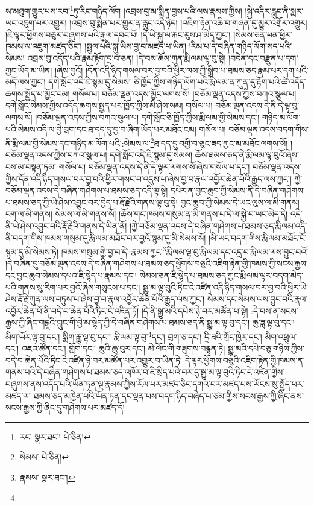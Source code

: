 ས་མཐུག་གྱུར་པས་རབ་\footnote{རང་  སྣར་ཐང་།  པེ་ཅིན། }ཏུ་རིང་གཉིད་ལོག །འབྲས་བུ་མ་སྨིན་བྱས་པའི་ལས་རྣམས་ཀྱིས། །སྐྱེ་འདིར་རླུང་ནི་སླར་ཡང་འཇུག་པར་འགྱུར། །འབྲས་བུ་སྨིན་པར་གྱུར་ན་རླུང་འདི་ཉིད། །འཇིག་རྟེན་འཆི་བ་གཞན་དུ་མྱུར་འགྲོར་འགྱུར། །ཇི་ལྟར་ཕྱོགས་བཅུར་བཞུགས་པའི་རྒྱལ་དབང་པོ། །དེ་ཡི་སྐུ་ལ་རྐང་རུས་ཤ་མེད་ཀྱང་། །སེམས་ཅན་ཕན་ཕྱིར་ཁམས་ལ་འཇུག་མཛད་ཅིང་། །སྤྲུལ་པའི་སྐུ་ཡིས་བྱ་བ་མཛད་པ་ཡིན། །རིམ་པ་དེ་བཞིན་གཉིད་ལོག་སད་པའི་སེམས། འབྲས་བུ་འདོད་པའི་རྣམ་རྟོག་དྲ་བ་ཅན། །དེ་བས་ཆོས་ཀུན་རྨི་ལམ་ལྟ་བུ་སྟེ། །བདེན་དང་བརྫུན་པ་དག་ཀྱང་ཡོད་མ་ཡིན། །ཞེས་བྱའོ། །དོན་འདི་ཉིད་གསལ་བར་བྱ་བའི་ཕྱིར་ལས་ཀྱི་སྒྲིབ་པ་ཐམས་ཅད་རྣམ་པར་དག་པའི་མདོ་ལས་ཀྱང་། དགེ་སློང་འདི་ཇི་སྙམ་དུ་སེམས། ཅི་ཁྱོད་ཀྱིས་གཉིད་ལོག་པའི་རྨི་ལམ་ན་ཀུན་དུ་རྟོག་པའི་ཚེ་འདོད་ཆགས་སྤྱོད་པ་མྱོང་ངམ། གསོལ་པ། བཅོམ་ལྡན་འདས་མྱོང་ལགས་སོ། །བཅོམ་ལྡན་འདས་ཀྱིས་བཀའ་སྩལ་པ། དགེ་སློང་སེམས་ཀྱིས་འདོད་ཆགས་སྤྱད་པར་ཁྱོད་ཀྱིས་མི་ཤེས་སམ། གསོལ་པ། བཅོམ་ལྡན་འདས་དེ་ནི་དེ་ལྟ་བུ་ལགས་སོ། །བཅོམ་ལྡན་འདས་ཀྱིས་བཀའ་སྩལ་པ། དགེ་སློང་ཅི་ཁྱོད་ཀྱིས་རྨི་ལམ་གྱི་སེམས་དང་། གཉིད་མ་ལོག་པའི་སེམས་འདི་ལ་བྱེ་བྲག་དང་ཐ་དད་དུ་བྱ་བ་ཞིག་ཡོད་པར་མཐོང་ངམ། གསོལ་པ། བཅོམ་ལྡན་འདས་བདག་གིས་ནི་རྨི་ལམ་གྱི་སེམས་དང་གཉིད་མ་ལོག་པའི་:སེམས་ལ་\footnote{སེམས་  པེ་ཅིན། }ཐ་དད་དུ་བགྱི་བ་ཅུང་ཟད་ཀྱང་མ་མཐོང་ལགས་སོ། །བཅོམ་ལྡན་འདས་ཀྱིས་བཀའ་སྩལ་པ། དགེ་སློང་འདི་ཇི་སྙམ་དུ་སེམས། ཆོས་ཐམས་ཅད་ནི་རྨི་ལམ་ལྟ་བུའོ་ཞེས་ངས་མ་བསྟན་ཏམ། གསོལ་པ། བཅོམ་ལྡན་འདས་དེ་ནི་དེ་ལྟར་ལགས་སོ་ཞེས་གསོལ་པ་དང་། བཅོམ་ལྡན་འདས་ཀྱིས་དོན་འདི་ཉིད་གསལ་བར་བྱ་བའི་ཕྱིར་གསང་བ་འདུས་པ་ཞེས་བྱ་བ་རྣལ་འབྱོར་ཆེན་པོའི་རྒྱུད་ལས་ཀྱང་། ཀྱེ་བཅོམ་ལྡན་འདས་དེ་བཞིན་གཤེགས་པ་ཐམས་ཅད་འདི་ལྟ་སྟེ། དཔེར་ན་བྱང་ཆུབ་ཀྱི་སེམས་ནི་དེ་བཞིན་གཤེགས་པ་ཐམས་ཅད་ཀྱི་ཡེ་ཤེས་འབྱུང་བར་བྱེད་པ་རྡོ་རྗེའི་གནས་ལྟ་བུ་སྟེ། བྱང་ཆུབ་ཀྱི་སེམས་དེ་ཡང་ལུས་ལ་མི་གནས། ངག་ལ་མི་གནས། སེམས་ལ་མི་གནས་སོ། །ཆོས་གང་ཁམས་གསུམ་ན་མི་གནས་པ་དེ་ལ་སྐྱེ་བ་ཡང་མེད་དེ། འདི་ནི་ཡེ་ཤེས་འབྱུང་བའི་རྡོ་རྗེའི་གནས་དེ་ཡིན་ནོ། །ཀྱེ་བཅོམ་ལྡན་འདས་དེ་བཞིན་གཤེགས་པ་ཐམས་ཅད་རྨི་ལམ་འདི་ནི་བདག་གིས་ཁམས་གསུམ་དུ་རྨི་ལམ་མཐོང་བར་བྱའོ་སྙམ་དུ་མི་སེམས་སོ། །མི་ཡང་བདག་གིས་རྨི་ལམ་མཐོང་ངོ་སྙམ་དུ་མི་སེམས་ཏེ། ཁམས་གསུམ་གྱི་བྱ་བ་དེ་:རྣམས་ཀྱང་\footnote{རྣམས་  སྣར་ཐང་། }རྨི་ལམ་ལྟ་བུ་རྨི་ལམ་དང་འདྲ་བ་རྨི་ལམ་ལས་བྱུང་བའོ། །དེ་བཞིན་དུ་བཅོམ་ལྡན་འདས་དེ་བཞིན་གཤེགས་པ་ཐམས་ཅད་ཕྱོགས་བཅུའི་འཇིག་རྟེན་གྱི་ཁམས་ཀྱི་སངས་རྒྱས་དང་བྱང་ཆུབ་སེམས་དཔའ་ཇི་སྙེད་པ་རྣམས་དང་། སེམས་ཅན་ཇི་སྙེད་པ་ཐམས་ཅད་ཀྱང་རྨི་ལམ་ལྟར་བདག་མེད་པའི་གནས་སུ་རིག་པར་བྱའོ་ཞེས་གསུངས་པ་དང་། སྒྱུ་མ་ལྟ་བུའི་ཏིང་ངེ་འཛིན་འདི་ཉིད་གསལ་བར་བྱ་བའི་ཕྱིར་ཡེ་ཤེས་རྡོ་རྗེ་ཀུན་ལས་བཏུས་པ་ཞེས་བྱ་བ་རྣལ་འབྱོར་ཆེན་པོའི་རྒྱུད་ལས་ཀྱང་། སེམས་དང་སེམས་ལས་བྱུང་བའི་རྣལ་འབྱོར་ཆེན་པོ་ནི་བདེ་བ་ཆེན་པོའི་ཏིང་ངེ་འཛིན་ཏོ། །དེ་ནི་སྒྱུ་མའི་དཔེས་ཉེ་བར་མཚོན་པ་སྟེ། :དེ་བས་ན་སངས་རྒྱས་ཀྱི་ཞིང་གངྒཱའི་ཀླུང་གི་བྱེ་མ་སྙེད་ཀྱི་དེ་བཞིན་གཤེགས་པ་ཐམས་ཅད་ནི་སྒྱུ་མ་ལྟ་བུ་དང་། ཆུ་ཟླ་ལྟ་བུ་དང་། མིག་ཡོར་ལྟ་བུ་དང་། སྨིག་རྒྱུ་ལྟ་བུ་དང་། རྨི་ལམ་ལྟ་བུ་\footnote{}དང་། བྲག་ཅ་དང་། དྲི་ཟའི་གྲོང་ཁྱེར་དང་། མིག་འཕྲུལ་དང་། འཇའ་ཚོན་དང་། གློག་དང་། ཆུའི་ཆུ་བུར་དང་། མེ་ལོང་གི་གཟུགས་བརྙན་ཏེ། སྒྱུ་མའི་དཔེ་བཅུ་གཉིས་ཀྱིས་བདེ་བ་ཆེན་པོའི་ཏིང་ངེ་འཛིན་ཉེ་བར་མཚོན་པར་འགྱུར་བ་ཡིན་ཏེ། དེ་ལྟར་ཕྱོགས་བཅུའི་འཇིག་རྟེན་གྱི་ཁམས་ན་གནས་པའི་དེ་བཞིན་གཤེགས་པ་ཐམས་ཅད་འཁོར་བ་ཇི་སྲིད་པའི་བར་དུ་སྒྱུ་མ་ལྟ་བུའི་ཏིང་ངེ་འཛིན་གྱིས་བཞུགས་ནས་འདོད་པའི་ཡོན་ཏན་ལྔ་རྣམས་ཀྱིས་རོལ་པར་མཛད་ཅིང་དགའ་བར་མཛད་པས་ཡོངས་སུ་སྤྱོད་པར་མཛད་ལ། ཐམས་ཅད་མཁྱེན་པའི་ཡོན་ཏན་དང་ལྡན་པས་བདག་ཉིད་བཞེད་པ་ཙམ་གྱིས་སངས་རྒྱས་ཀྱི་ཞིང་ནས་སངས་རྒྱས་ཀྱི་ཞིང་དུ་གཤེགས་པར་མཛད་དོ། 